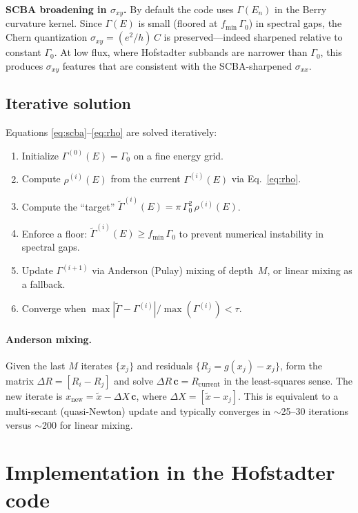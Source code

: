 \documentclass[11pt]{article}
\newcommand{\Gam}{\Gamma}
\begin{document}
\textbf{SCBA broadening in $\sigma_{xy}$.}  By default the code uses
$\Gam(E_n)$ in the Berry curvature kernel.  Since $\Gam(E)$ is small
(floored at $f_{\min}\,\Gam_0$) in spectral gaps, the Chern
quantization $\sigma_{xy} = (e^2/h)\,C$ is preserved---indeed
sharpened relative to constant $\Gam_0$.  At low flux, where Hofstadter
subbands are narrower than $\Gam_0$, this produces $\sigma_{xy}$
features that are consistent with the SCBA-sharpened $\sigma_{xx}$.

\subsection{Iterative solution}

Equations \eqref{eq:scba}--\eqref{eq:rho} are solved iteratively:
\begin{enumerate}
  \item Initialize $\Gam^{(0)}(E) = \Gam_0$ on a fine energy grid.
  \item Compute $\rho^{(i)}(E)$ from the current $\Gam^{(i)}(E)$
    via Eq.~\eqref{eq:rho}.
  \item Compute the ``target'' $\widetilde{\Gam}^{(i)}(E)
    = \pi\,\Gam_0^2\, \rho^{(i)}(E)$.
  \item Enforce a floor:
    $\widetilde{\Gam}^{(i)}(E) \ge f_{\min}\,\Gam_0$ to prevent
    numerical instability in spectral gaps.
  \item Update $\Gam^{(i+1)}$ via Anderson (Pulay) mixing of
    depth~$M$, or linear mixing as a fallback.
  \item Converge when
    $\max|\widetilde{\Gam} - \Gam^{(i)}| / \max(\Gam^{(i)}) < \tau$.
\end{enumerate}

\paragraph{Anderson mixing.}
Given the last $M$ iterates $\{x_j\}$ and residuals
$\{R_j = g(x_j) - x_j\}$, form the matrix
$\Delta R = [R_{i} - R_j]$ and solve
$\Delta R\, \mathbf{c} = R_{\mathrm{current}}$ in the least-squares
sense.  The new iterate is
$x_{\mathrm{new}} = \widetilde{x} - \Delta X\,\mathbf{c}$, where
$\Delta X = [\widetilde{x} - x_j]$.  This is equivalent to a
multi-secant (quasi-Newton) update and typically converges in
$\sim$25--30 iterations versus $\sim$200 for linear mixing.

\section{Implementation in the Hofstadter code}
\end{document}
